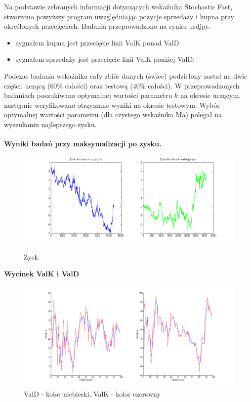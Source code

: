 \documentclass[12pt,a4paper]{article}
\begin{document}
Na podstawie zebranych informacji dotyczących wskaźnika Stochastic Fast, stworzono powyższy program uwzględniając pozycje sprzedaży i kupna przy określonych przecięciach. Badania przeprowadzono na rynku usdjpy.
\begin{itemize}
\item sygnałem kupna jest przecięcie linii ValK ponad ValD
\item sygnałem sprzedaży jest przecięcie linii ValK poniżej ValD.
\end{itemize}
Podczas badania wskaźnika cały zbiór danych (świec) podzielony został na dwie części: uczącą ($60\%$ całości) oraz testową ($40\%$ całości). W przeprowadzonych badaniach poszukiwano optymalnej wartości parametru $k$ na okresie uczącym, następnie weryfikowano otrzymane wyniki na okresie testowym. Wybór optymalnej wartości parametru (dla czystego wskaźnika Ma) polegał na wyszukaniu najlepszego zysku. \\
\newpage
\noindent \textbf{\\Wyniki badań przy maksymalizacji po zysku.}\\
\begin{figure}[h!]
\centering
\includegraphics[scale=0.6]{SF_zysk_us.png}\\
\caption{Zysk}
\end{figure}
\FloatBarrier
\noindent \textbf{Wycinek ValK i ValD}\\
\begin{figure}[h!]
\centering
\includegraphics[scale=0.4]{ValD_ValK_us.png}
\caption{ValD - kolor niebieski, ValK - kolor czerowny }
\end{figure}
\FloatBarrier
\end{document}
